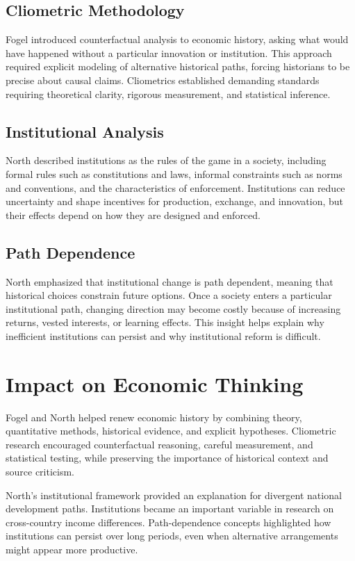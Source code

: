 \subsection*{Cliometric Methodology}
Fogel introduced counterfactual analysis to economic history, asking what would
have happened without a particular innovation or institution. This approach
required explicit modeling of alternative historical paths, forcing historians
to be precise about causal claims. Cliometrics established demanding standards
requiring theoretical clarity, rigorous measurement, and statistical inference.

\subsection*{Institutional Analysis}
North described institutions as the rules of the game in a society, including
formal rules such as constitutions and laws, informal constraints such as norms
and conventions, and the characteristics of enforcement. Institutions can
reduce uncertainty and shape incentives for production, exchange, and
innovation, but their effects depend on how they are designed and enforced.

\subsection*{Path Dependence}
North emphasized that institutional change is path dependent, meaning that
historical choices constrain future options. Once a society enters a particular
institutional path, changing direction may become costly because of increasing
returns, vested interests, or learning effects. This insight helps explain why
inefficient institutions can persist and why institutional reform is difficult.

\section{Impact on Economic Thinking}
Fogel and North helped renew economic history by combining theory, quantitative
methods, historical evidence, and explicit hypotheses. Cliometric research
encouraged counterfactual reasoning, careful measurement, and statistical
testing, while preserving the importance of historical context and source
criticism.

North's institutional framework provided an explanation for divergent national
development paths. Institutions became an important variable in research on
cross-country income differences. Path-dependence concepts highlighted how
institutions can persist over long periods, even when alternative arrangements
might appear more productive.

